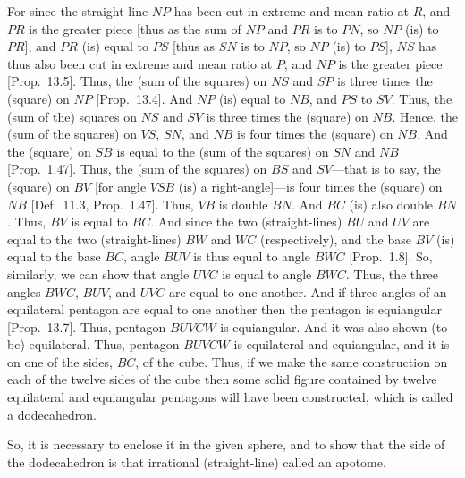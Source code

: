 \begin{Parallel}{}{}
{For since the straight-line $NP$ has been cut in extreme and mean ratio at
$R$, and $PR$ is the greater piece [thus as the sum of
$NP$ and $PR$ is to $PN$, so $NP$ (is) to $PR$], and $PR$
(is) equal to $PS$ [thus as $SN$ is to $NP$, so $NP$ (is) to $PS$], 
$NS$ has thus also been cut in extreme and mean ratio at $P$, and $NP$
is the greater piece [Prop.~13.5]. Thus, the (sum of the squares) on
$NS$ and $SP$ is three times the (square) on $NP$ [Prop.~13.4].
And $NP$ (is) equal to $NB$, and $PS$ to $SV$. Thus, the (sum of the)
squares on  $NS$ and $SV$ is three times the (square) on $NB$.
Hence, the (sum of the squares) on $VS$, $SN$, and $NB$
is four times the (square) on $NB$. And the (square) on $SB$
is equal to the (sum of the squares) on
$SN$ and $NB$  [Prop.~1.47].
Thus, the (sum of the squares) on $BS$ and $SV$---that is to say, 
the (square) on $BV$ [for angle $VSB$ (is) a right-angle]---is
four times the (square) on $NB$ [Def.~11.3, Prop.~1.47].
Thus, $VB$ is double $BN$. And $BC$ (is) also double $BN$.
Thus, $BV$ is equal to $BC$. And since the two (straight-lines)
$BU$ and $UV$ are equal to the two (straight-lines)
$BW$ and $WC$ (respectively), and the base $BV$ (is) equal to
the base $BC$, angle $BUV$ is thus equal to angle $BWC$ [Prop.~1.8].
So, similarly, we can show that angle $UVC$ is equal to angle
$BWC$.  Thus, the three angles
$BWC$, $BUV$, and $UVC$ are equal to one another.
And if three angles of an equilateral pentagon are equal to one another
then the pentagon is equiangular [Prop.~13.7].  Thus, pentagon
$BUVCW$ is equiangular. And it was also shown (to be)
equilateral. Thus, pentagon $BUVCW$ is equilateral and equiangular,
and it is on one of the sides, $BC$, of the cube. Thus, if we make the
same construction on each of the twelve sides of the cube then some solid
figure contained by twelve equilateral and equiangular pentagons 
will have been constructed,  which is called a dodecahedron.

So, it is necessary to enclose it in the given sphere, and to show that the
side of the dodecahedron is that irrational (straight-line) called an apotome.

}
\end{Parallel}
